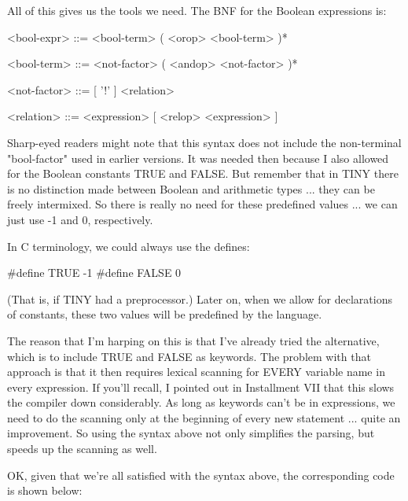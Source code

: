 \documentclass[float=false, crop=false]{standalone}
\begin{document}
All of this gives us the tools we need. The BNF for the Boolean expressions is:


     <bool-expr> ::= <bool-term> ( <orop> <bool-term> )*

     <bool-term> ::= <not-factor> ( <andop> <not-factor> )*

     <not-factor> ::= [ '!' ] <relation>

     <relation> ::= <expression> [ <relop> <expression> ]


Sharp-eyed readers might note that this syntax does not include the non-terminal
"bool-factor" used in earlier versions. It was needed then because I also
allowed for the Boolean constants TRUE and FALSE. But remember that in TINY
there is no distinction made between Boolean and arithmetic types ... they can
be freely intermixed. So there is really no need for these predefined values ...
we can just use -1 and 0, respectively.

In C terminology, we could always use the defines:


     #define TRUE -1
     #define FALSE 0


(That is, if TINY had a preprocessor.) Later on, when we allow for declarations
of constants, these two values will be predefined by the language.

The reason that I'm harping on this is that I've already tried the alternative,
which is to include TRUE and FALSE as keywords. The problem with that approach
is that it then requires lexical scanning for EVERY variable name in every
expression. If you'll recall, I pointed out in Installment VII that this slows
the compiler down considerably. As long as keywords can't be in expressions, we
need to do the scanning only at the beginning of every new statement ... quite
an improvement. So using the syntax above not only simplifies the parsing, but
speeds up the scanning as well.

OK, given that we're all satisfied with the syntax above, the corresponding code
is shown below:
\end{document}
